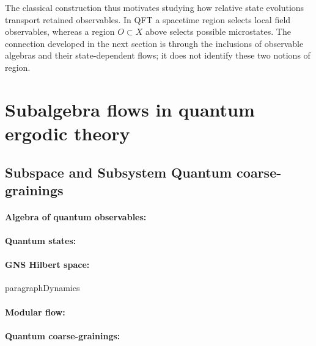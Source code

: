 \documentclass[a4paper,11pt]{article}
\theoremstyle{definition}
\begin{document}
The classical construction thus motivates studying how relative state evolutions transport retained observables. In QFT a spacetime region selects local field observables, whereas a region $O\subset X$ above selects possible microstates. The connection developed in the next section is through the inclusions of observable algebras and their state-dependent flows; it does not identify these two notions of region.




\section{Subalgebra flows in quantum ergodic theory}\label{section:basics}

\subsection{Subspace and Subsystem Quantum coarse-grainings}

\paragraph{Algebra of quantum observables:}

\paragraph{Quantum states:}

\paragraph{GNS Hilbert space:}

paragraph{Dynamics}

\paragraph{Modular flow:}

\paragraph{Quantum coarse-grainings:}
\end{document}
